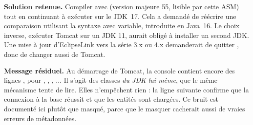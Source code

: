 \textbf{Solution retenue.} Compiler avec  (version majeure 55, lisible par cette
ASM) tout en continuant à exécuter sur le JDK~17. Cela a demandé de réécrire une comparaison utilisant la syntaxe
 avec variable, introduite en Java~16. Le choix inverse, exécuter Tomcat sur un JDK 11, aurait
obligé à installer un second JDK. Une mise à jour d'EclipseLink vers la série 3.x ou 4.x demanderait de quitter
, donc de changer aussi de Tomcat.

\textbf{Message résiduel.} Au démarrage de Tomcat, la console contient encore des lignes
, pour ,
, , ... Il s'agit des classes \textit{du JDK lui-même}, que le même mécanisme
tente de lire. Elles n'empêchent rien : la ligne suivante confirme que la connexion à la base réussit et que les
entités sont chargées. Ce bruit est documenté ici plutôt que masqué, parce que le masquer cacherait aussi de vraies
erreurs de métadonnées.

